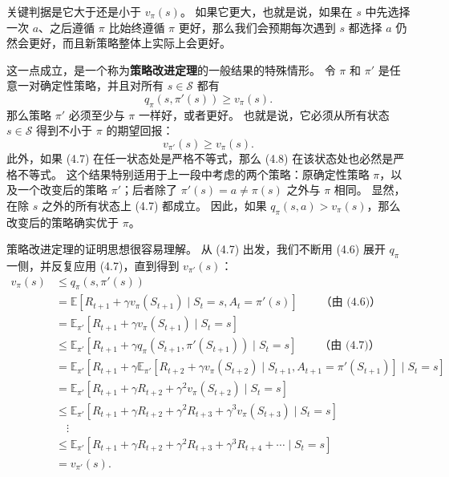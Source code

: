 \documentclass[UTF8, 12pt, fontset=fandol, oneside]{ctexart}
\begin{document}
关键判据是它大于还是小于 $v_\pi(s)$。
如果它更大，也就是说，如果在 $s$ 中先选择一次 $a$、之后遵循 $\pi$ 比始终遵循 $\pi$ 更好，那么我们会预期每次遇到 $s$ 都选择 $a$ 仍然会更好，而且新策略整体上实际上会更好。

这一点成立，是一个称为\textbf{策略改进定理}的一般结果的特殊情形。
令 $\pi$ 和 $\pi'$ 是任意一对确定性策略，并且对所有 $s\in\mathcal{S}$ 都有
\begin{equation}
q_\pi(s,\pi'(s))\ge v_\pi(s).
\tag{4.7}
\end{equation}
那么策略 $\pi'$ 必须至少与 $\pi$ 一样好，或者更好。
也就是说，它必须从所有状态 $s\in\mathcal{S}$ 得到不小于 $\pi$ 的期望回报：
\begin{equation}
v_{\pi'}(s)\ge v_\pi(s).
\tag{4.8}
\end{equation}
此外，如果 (4.7) 在任一状态处是严格不等式，那么 (4.8) 在该状态处也必然是严格不等式。
这个结果特别适用于上一段中考虑的两个策略：原确定性策略 $\pi$，以及一个改变后的策略 $\pi'$；后者除了 $\pi'(s)=a\ne\pi(s)$ 之外与 $\pi$ 相同。
显然，在除 $s$ 之外的所有状态上 (4.7) 都成立。
因此，如果 $q_\pi(s,a)>v_\pi(s)$，那么改变后的策略确实优于 $\pi$。

策略改进定理的证明思想很容易理解。
从 (4.7) 出发，我们不断用 (4.6) 展开 $q_\pi$ 一侧，并反复应用 (4.7)，直到得到 $v_{\pi'}(s)$：
\[
\begin{aligned}
v_\pi(s)
&\le q_\pi(s,\pi'(s))\\
&= \mathbb{E}[R_{t+1}+\gamma v_\pi(S_{t+1})\mid S_t=s,A_t=\pi'(s)] \qquad \text{（由 (4.6)）}\\
&= \mathbb{E}_{\pi'}[R_{t+1}+\gamma v_\pi(S_{t+1})\mid S_t=s]\\
&\le \mathbb{E}_{\pi'}[R_{t+1}+\gamma q_\pi(S_{t+1},\pi'(S_{t+1}))\mid S_t=s] \qquad \text{（由 (4.7)）}\\
&= \mathbb{E}_{\pi'}[R_{t+1}+\gamma\mathbb{E}_{\pi'}[R_{t+2}+\gamma v_\pi(S_{t+2})\mid S_{t+1},A_{t+1}=\pi'(S_{t+1})]\mid S_t=s]\\
&= \mathbb{E}_{\pi'}[R_{t+1}+\gamma R_{t+2}+\gamma^2v_\pi(S_{t+2})\mid S_t=s]\\
&\le \mathbb{E}_{\pi'}[R_{t+1}+\gamma R_{t+2}+\gamma^2R_{t+3}+\gamma^3v_\pi(S_{t+3})\mid S_t=s]\\
&\quad\vdots\\
&\le \mathbb{E}_{\pi'}[R_{t+1}+\gamma R_{t+2}+\gamma^2R_{t+3}+\gamma^3R_{t+4}+\cdots\mid S_t=s]\\
&= v_{\pi'}(s).
\end{aligned}
\]
\end{document}
